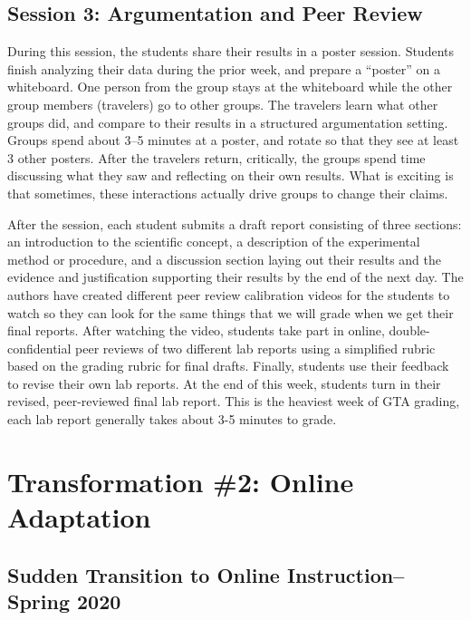 \documentclass[aip, numerical, preprint]{revtex4-2}
\begin{document}
\subsection{Session 3: Argumentation and Peer Review}
During this session, the students share their results in a poster session.  Students finish analyzing
their data during the prior week, and prepare a ``poster'' on a whiteboard.  One person from
the group stays at the whiteboard while the other group members (travelers) go to other groups.
The travelers learn what other groups did, and compare to their results in a structured
argumentation setting.  Groups spend about 3--5 minutes at a poster, and rotate so that they
see at least 3 other posters.  After the travelers return, critically, the groups spend time
discussing what they saw and reflecting on their own results.  What is exciting is that
sometimes, these interactions actually drive groups to change their claims.\citep{Walker2019}

After the session, each student submits a draft report consisting of three sections: an 
introduction to the
scientific concept, a description of the experimental method or procedure, and a discussion
section laying out their results and the evidence and justification supporting their results by the 
end of the next day.
The authors have created different peer review calibration videos for the students to watch so
they can look for the same things that we will grade when we get their
final reports.  After watching the video, students take part in online, double-confidential peer 
reviews of two different lab reports using a simplified rubric based on the grading rubric for final drafts.
Finally, students use their feedback to revise their own lab reports.  At the end of
this week, students turn in their revised, peer-reviewed final lab report.  This is the
heaviest week of GTA grading, each lab report generally takes about 3-5 minutes to grade.

\section{Transformation \#2: Online Adaptation}

\subsection{Sudden Transition to Online Instruction--Spring 2020}
\end{document}
